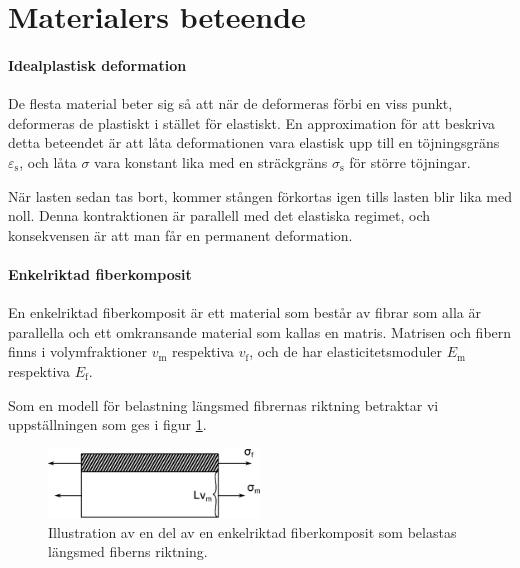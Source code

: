 \section{Materialers beteende}

\paragraph{Idealplastisk deformation}
De flesta material beter sig så att när de deformeras förbi en viss punkt, deformeras de plastiskt i stället för elastiskt. En approximation för att beskriva detta beteendet är att låta deformationen vara elastisk upp till en töjningsgräns $\varepsilon_{\text{s}}$, och låta $\sigma$ vara konstant lika med en sträckgräns $\sigma_{\text{s}}$ för större töjningar.

När lasten sedan tas bort, kommer stången förkortas igen tills lasten blir lika med noll. Denna kontraktionen är parallell med det elastiska regimet, och konsekvensen är att man får en permanent deformation.

\paragraph{Enkelriktad fiberkomposit}
En enkelriktad fiberkomposit är ett material som består av fibrar som alla är parallella och ett omkransande material som kallas en matris. Matrisen och fibern finns i volymfraktioner $v_{\text{m}}$ respektiva $v_{\text{f}}$, och de har elasticitetsmoduler $E_{\text{m}}$ respektiva $E_{\text{f}}$.

Som en modell för belastning längsmed fibrernas riktning betraktar vi uppställningen som ges i figur \ref{fig:fiber_composite_parallel}.
\begin{figure}[!ht]
	\centering
	\includegraphics[width = 0.5\textwidth]{./Images/fiber_composite_parallel.eps}
	\caption{Illustration av en del av en enkelriktad fiberkomposit som belastas längsmed fiberns riktning.}
	\label{fig:fiber_composite_parallel}
\end{figure}

